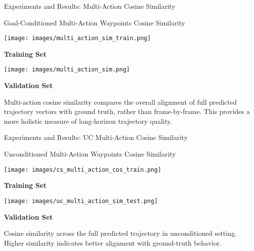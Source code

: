 \documentclass{beamer}
\begin{document}
\begin{frame}{Experiments and Results: Multi-Action Cosine Similarity}
    \begin{block}{Goal-Conditioned Multi-Action Waypoints Cosine Similarity}
        \begin{minipage}{0.48\textwidth}
            \centering
            \texttt{[image: images/multi\_action\_sim\_train.png]}
            
            
            \textbf{Training Set}
        \end{minipage}
        \hfill
        \begin{minipage}{0.48\textwidth}
            \centering
            \texttt{[image: images/multi\_action\_sim.png]}
        
            
            \textbf{Validation Set}
        \end{minipage}
        
        \vspace{0.5em}
        \bigskip
        Multi-action cosine similarity compares the overall alignment of full predicted trajectory vectors with ground truth, rather than frame-by-frame. This provides a more holistic measure of long-horizon trajectory quality.
    \end{block}
\end{frame}

\begin{frame}{Experiments and Results: UC Multi-Action Cosine Similarity}
    \begin{block}{Unconditioned Multi-Action Waypoints Cosine Similarity}
        \begin{minipage}{0.48\textwidth}
            \centering
            \texttt{[image: images/cs\_multi\_action\_cos\_train.png]}
            
            \textbf{Training Set}
        \end{minipage}
        \hfill
        \begin{minipage}{0.48\textwidth}
            \centering
            \texttt{[image: images/uc\_multi\_action\_sim\_test.png]}
            
            \textbf{Validation Set}
        \end{minipage}
        
        \vspace{0.5em}
        \bigskip
        Cosine similarity across the full predicted trajectory in unconditioned setting. Higher similarity indicates better alignment with ground-truth behavior.
    \end{block}
\end{frame}
\end{document}
